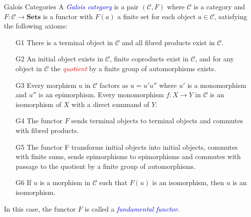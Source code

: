 \documentclass{beamer}
\newcommand{\catSets}{\mathbf{Sets}}
\newcommand{\scrC}{\mathscr{C}} %
\newcommand{\define}[1]{\textcolor{blue}{\textit{#1}}}
\newcommand{\caution}[1]{\textcolor{red}{\textit{#1}}}
\begin{document}
\begin{frame}{Galois Categories}
	\fontsize{10pt}{7.2}\selectfont
	A \define{Galois category} is a pair $(\scrC, F)$ where $\scrC$ is a category and $F:\scrC\to\catSets$ is a functor with $F(a)$ a finite set for each object $a\in\scrC$, satisfying the following axioms: \pause 

	\begin{enumerate}
		\item[G1] There is a terminal object in $\scrC$ and all fibred products exist in $\scrC$. \pause 

		\item[G2] An initial object exists in $\scrC$, finite coproducts exist in $\scrC$, and for any object in $\scrC$ the \caution{quotient} by a finite group of automorphisms exists. \pause 

		\item[G3] Every morphism $u$ in $\scrC$ factors as $u = u'u''$ where $u'$ is a monomorphism and $u''$ is an epimorphism. Every monomorphism $f: X\to Y$ in $\scrC$ is an isomorphism of $X$ with a direct summand of $Y$. \pause 

		\item[G4] The functor $F$ sends terminal objects to terminal objects and commutes with fibred products. \pause 

		\item[G5] The functor F transforms initial objects into initial objects, commutes with finite sums, sends epimorphisms to epimorphisms and commutes with passage to the quotient by a finite group of automorphisms. \pause 

		\item[G6] If $u$ is a morphism in $\scrC$ such that $F(u)$ is an isomorphism, then  $u$ is an isomorphism. \pause 
	\end{enumerate}
	In this case, the functor $F$ is called a \define{fundamental functor}.
\end{frame}
\end{document}

